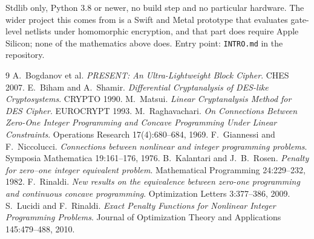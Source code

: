 \documentclass[11pt,a4paper]{article}
\begin{document}
Stdlib only, Python 3.8 or newer, no build step and no particular hardware. The
wider project this comes from is a Swift and Metal prototype that evaluates
gate-level netlists under homomorphic encryption, and that part does require
Apple Silicon; none of the mathematics above does. Entry point:
\texttt{INTRO.md} in the repository.

\begin{thebibliography}{9}
 A.~Bogdanov et al.
  \emph{PRESENT: An Ultra-Lightweight Block Cipher}. CHES 2007.
 E.~Biham and A.~Shamir.
  \emph{Differential Cryptanalysis of DES-like Cryptosystems}. CRYPTO 1990.
 M.~Matsui.
  \emph{Linear Cryptanalysis Method for DES Cipher}. EUROCRYPT 1993.
 M.~Raghavachari.
  \emph{On Connections Between Zero-One Integer Programming and Concave
  Programming Under Linear Constraints}. Operations Research 17(4):680--684, 1969.
 F.~Giannessi and F.~Niccolucci.
  \emph{Connections between nonlinear and integer programming problems}.
  Symposia Mathematica 19:161--176, 1976.
 B.~Kalantari and J.~B.~Rosen.
  \emph{Penalty for zero--one integer equivalent problem}.
  Mathematical Programming 24:229--232, 1982.
 F.~Rinaldi.
  \emph{New results on the equivalence between zero-one programming and
  continuous concave programming}. Optimization Letters 3:377--386, 2009.
 S.~Lucidi and F.~Rinaldi.
  \emph{Exact Penalty Functions for Nonlinear Integer Programming Problems}.
  Journal of Optimization Theory and Applications 145:479--488, 2010.
\end{thebibliography}
\end{document}
